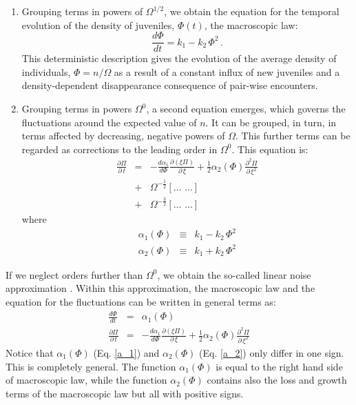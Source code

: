 \begin{enumerate}
	\item Grouping terms in powers of $\Omega^{1/2}$, we obtain the equation for the temporal evolution of the density of juveniles, $\Phi(t)$, the macroscopic law:
	\begin{equation}
		\label{macroscopic_law}
		\frac{d\Phi}{dt} = k_{1} - k_{2}\,\Phi^2\,.
	\end{equation}
	This deterministic description gives the evolution of the average density of individuals, $\Phi=n/\Omega$ as a result of a constant influx of new juveniles and a density-dependent disappearance consequence of pair-wise encounters. 
	\item Grouping terms in powers $\Omega^0$, a second equation emerges, which governs the fluctuations around the expected value of $n$. It can be grouped, in turn, in terms affected by decreasing, negative powers of $\Omega$. This further terms can be regarded as corrections to the leading order in $\Omega^0$. This equation is:
	\begin{eqnarray}
		\label{linear}
		\frac{\partial\Pi}{\partial\,t}&=&-\frac{d\alpha_1}{d\Phi}\frac{\partial(\xi\Pi)}{\partial\,\xi}+\frac{1}{2}\alpha_2(\Phi)\frac{\partial^2\Pi}{\partial\,\xi^2}\\
		&+&\Omega^{-\frac{1}{2}}\left[\dots\,\,\dots\right]\nonumber\\
		&+&\Omega^{-\frac{3}{2}}\left[\dots\,\,\dots\right]\nonumber
	\end{eqnarray} 
	where
	\begin{eqnarray}
		\label{a_1}
		\alpha_1(\Phi) &\equiv& k_{1} - k_{2}\,\Phi^2 \\ 
		\alpha_2(\Phi) &\equiv& k_{1} + k_{2}\,\Phi^2
		\label{a_2}
	\end{eqnarray} 
\end{enumerate}

If we neglect orders further than $\Omega^{0}$, we obtain the so-called linear noise approximation \cite{vanKampen92}. Within this approximation, the macroscopic law and the equation for the fluctuations can be written in general terms as:
\begin{eqnarray}
	\frac{d\Phi}{dt} &=& \alpha_1(\Phi)\\
	\frac{\partial\Pi}{\partial\,t}&=&-\frac{d\alpha_1}{d\Phi}\frac{\partial(\xi\Pi)}{\partial\,\xi}+\frac{1}{2}\alpha_2(\Phi)\frac{\partial^2\Pi}{\partial\,\xi^2}
	\label{linear_noise}
\end{eqnarray}
Notice that $\alpha_1(\Phi)$ (Eq. \ref{a_1}) and $\alpha_2(\Phi)$ (Eq. \ref{a_2}) only differ in one sign. This is completely general. The function $\alpha_1(\Phi)$ is equal to the right hand side of macroscopic law, while the function $\alpha_2(\Phi)$ contains also the loss and growth terms of the macroscopic law but all with positive signs. 

